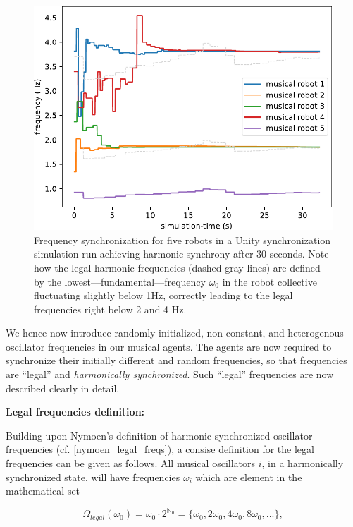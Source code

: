 	\begin{figure}
		\centering
		\includegraphics[width=\linewidth]{Assets/DocSegments/Chapters/ExperimentsAndResults/Figures/Explanations/FrequencySynchronizationPlot.pdf}
		\caption[Simulation run plot: frequency plot.]{Frequency synchronization for five robots in a Unity synchronization simulation run achieving harmonic synchrony after 30 seconds. Note how the legal harmonic frequencies (dashed gray lines) are defined by the lowest—fundamental—frequency $\omega_0$ in the robot collective fluctuating slightly below 1Hz, correctly leading to the legal frequencies right below 2 and 4 Hz.}
		\label{fig:frequency_synch}
	\end{figure}
	
	We hence now introduce randomly initialized, non-constant, and heterogenous oscillator frequencies in our musical agents. The agents are now required to synchronize their initially different and random frequencies, so that frequencies are ``legal'' and \textit{harmonically synchronized}. Such ``legal'' frequencies are now described clearly in detail. \nl
	
	\textbf{Legal frequencies definition:} \nl

	Building upon Nymoen's definition of harmonic synchronized oscillator frequencies (cf. \eqref{nymoen_legal_freqs}), a consise definition for the legal frequencies can be given as follows. All musical oscillators $i$, in a harmonically synchronized state, will have frequencies $\omega_i$ which are element in the mathematical set

	\begin{equation}\label{impl_legal_freqs}
	\Omega_{legal}(\omega_0) = \omega_{0} \cdot 2^{\mathbb{N}_0} = \{\omega_{0}, 2\omega_{0}, 4\omega_{0}, 8\omega_{0}, ...\} ,
	\end{equation}

